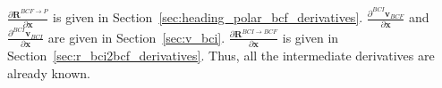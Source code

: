 \documentclass[]{article}
\newcommand{\vb}[1]{\bm{#1}} %
\newcommand{\pd}[2]{\frac{\partial #1}{\partial #2}} %
\begin{document}
\noindent $\pd{\vb{R}^{BCF \rightarrow P}}{\vb{x}}$ is given in Section~\ref{sec:heading_polar_bcf_derivatives}. $\pd{^{BCI} \vb{v}_{BCF}}{\vb{x}}$ and $\pd{^{BCI} \vb{v}_{BCI}}{\vb{x}}$ are given in Section~\ref{sec:v_bci}. $\pd{\vb{R}^{BCI \rightarrow BCF}}{\vb{x}}$ is given in Section~\ref{sec:r_bci2bcf_derivatives}. Thus, all the intermediate derivatives are already known.













\end{document}
